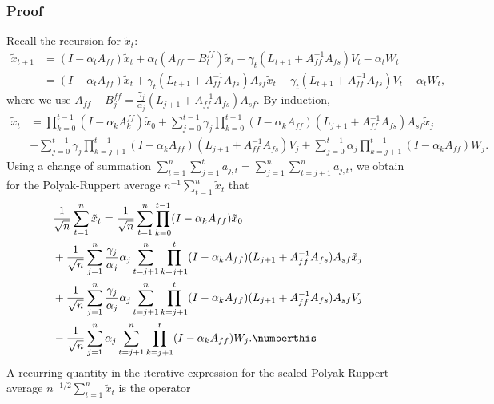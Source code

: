 \subsubsection{Proof}
Recall the recursion for $\tilde{x}_t$:
\begin{align*}
    \tilde{x}_{t+1} 
    &= (I - \alpha_t A_{ff}) \tilde{x}_t + \alpha_t (A_{ff} - B^{ff}_t) \tilde{x}_t
    - \gamma_t (L_{t+1} + A_{ff}^{-1} A_{fs}) V_{t} - \alpha_t W_{t} 
    \\
    &= (I - \alpha_t A_{ff}) \tilde{x}_t + \gamma_t (L_{t+1} + A_{ff}^{-1} A_{fs}) A_{sf}  \tilde{x}_t
    - \gamma_t (L_{t+1} + A_{ff}^{-1} A_{fs}) V_{t} - \alpha_t W_{t} ,
\end{align*}
where we use
$A_{ff} - B_j^{ff} = \frac{\gamma_j}{\alpha_j}(L_{j+1} + A_{ff}^{-1} A_{fs}) A_{sf}$.
By induction, 
\begin{align}
    \tilde{x}_t 
    &= \prod_{k=0}^{t-1} (I - \alpha_k A_k^{ff}) \tilde{x}_0 
    + \sum_{j=0}^{t-1}  \gamma_j  \prod_{k=0}^{t-1} (I - \alpha_k A_{ff})(L_{j+1} + A_{ff}^{-1} A_{fs}) A_{sf} \tilde{x}_j
    \\
    &+ \sum_{j=0}^{t-1} \gamma_j \prod_{k=j+1}^{t-1} (I - \alpha_k A_{ff}) (L_{j+1} + A_{ff}^{-1} A_{fs}) V_j 
    + \sum_{j=0}^{t-1} \alpha_j \prod_{k=j+1}^{t-1} (I - \alpha_k A_{ff}) W_j .    \label{eq:xtilde}
\end{align}
Using a change of summation $\sum_{t=1}^{n} \sum_{j=1}^{t} a_{j,t} = \sum_{j=1}^{n} \sum_{t=j+1}^{n} a_{j,t}$, we obtain for the Polyak-Ruppert average $n^{-1} \sum_{t=1}^n \tilde{x}_t$ that
\begin{align*}
    &\frac{1}{\sqrt{n}} \sum_{t=1}^n \tilde{x}_t 
    = \frac{1}{\sqrt{n}} \sum_{t=1}^n \prod_{k=0}^{t-1}(I - \alpha_k A_{ff}) \tilde{x}_0 
    \\ 
    & + \frac{1}{\sqrt{n}}\sum_{j=1}^{n} \frac{\gamma_j}{\alpha_j} \alpha_j \sum_{t=j+1}^n \prod_{k=j+1}^{t} (I - \alpha_k A_{ff}) (L_{j+1} + A_{ff}^{-1} A_{fs})A_{sf} \tilde{x}_j      \\ & 
    + \frac{1}{\sqrt{n}}\sum_{j=1}^{n} \frac{\gamma_j}{\alpha_j} \alpha_j \sum_{t=j+1}^n \prod_{k=j+1}^{t} (I - \alpha_k A_{ff}) (L_{j+1} + A_{ff}^{-1} A_{fs})A_{sf} V_j
    \\ &
    - \frac{1}{\sqrt{n}}\sum_{j=1}^{n} \alpha_j \sum_{t=j+1}^n \prod_{k=j+1}^{t} (I - \alpha_k A_{ff}) W_j . \numberthis \label{eq:xtilde_induction}
\end{align*}
A recurring quantity in the iterative expression for the scaled Polyak-Ruppert average $n^{-1/2} \sum_{t=1}^n \tilde{x}_t$ is the operator
